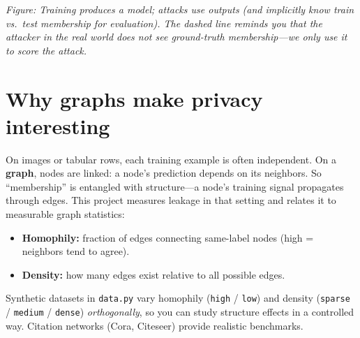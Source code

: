 \documentclass[11pt,a4paper]{article}
\begin{document}
\begin{center}
\end{center}
\textit{Figure: Training produces a model; attacks use outputs (and implicitly know train vs.\ test membership for evaluation). The dashed line reminds you that the \emph{attacker} in the real world does not see ground-truth membership---we only use it to score the attack.}

\section{Why graphs make privacy interesting}

On images or tabular rows, each training example is often independent. On a \textbf{graph}, nodes are linked: a node's prediction depends on its neighbors. So ``membership'' is entangled with structure---a node's training signal propagates through edges. This project measures leakage in that setting and relates it to measurable graph statistics:
\begin{itemize}
  \item \textbf{Homophily:} fraction of edges connecting same-label nodes (high = neighbors tend to agree).
  \item \textbf{Density:} how many edges exist relative to all possible edges.
\end{itemize}
Synthetic datasets in \texttt{data.py} vary homophily (\texttt{high} / \texttt{low}) and density (\texttt{sparse} / \texttt{medium} / \texttt{dense}) \emph{orthogonally}, so you can study structure effects in a controlled way. Citation networks (Cora, Citeseer) provide realistic benchmarks.
\end{document}

